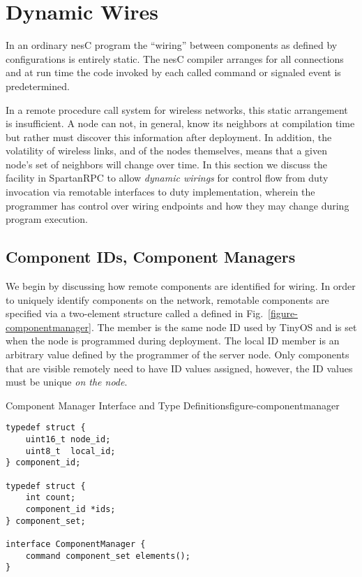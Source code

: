\section{Dynamic Wires}
\label{section-dynamic-wires}

In an ordinary nesC program the ``wiring'' between components as defined by configurations is
entirely static. The nesC compiler arranges for all connections and at run time the code invoked
by each called command or signaled event is predetermined.

In a remote procedure call system for wireless networks, this static arrangement is
insufficient. A node can not, in general, know its neighbors at compilation time but rather must
discover this information after deployment. In addition, the volatility of wireless links, and
of the nodes themselves, means that a given node's set of neighbors will change over time. In
this section we discuss the facility in SpartanRPC to allow \emph{dynamic wirings} for control
flow from duty invocation via remotable interfaces to duty implementation, wherein the
programmer has control over wiring endpoints and how they may change during program execution.

\subsection{Component IDs, Component Managers}
\label{section-componentmanager}

We begin by discussing how remote components are identified for wiring. In order to uniquely
identify components on the network, remotable components are specified via a two-element
structure called a  defined in Fig.~\ref{figure-componentmanager}. The
 member is the same node ID used by TinyOS and is set when the node is programmed
during deployment. The local ID member is an arbitrary value defined by the programmer of the
server node. Only components that are visible remotely need to have ID values assigned, however,
the ID values must be unique \emph{on the node}.
 
\begin{fpfig}[!t]{Component Manager Interface and Type Definitions}{figure-componentmanager}
{
\begin{Verbatim}
typedef struct {
    uint16_t node_id;
    uint8_t  local_id;
} component_id;

typedef struct {
    int count;
    component_id *ids;
} component_set;

interface ComponentManager { 
    command component_set elements();
}
\end{Verbatim}
}
\end{fpfig}

